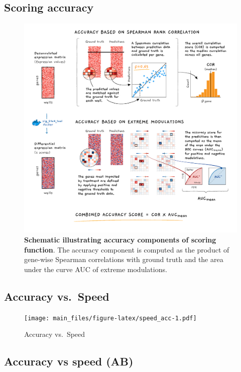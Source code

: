 \documentclass[]{article}
\begin{document}
\hypertarget{scoring-accuracy}{%
\subsection{Scoring accuracy}\label{scoring-accuracy}}

\begin{figure}
\centering
\includegraphics{figures/deconvolution_contest Fig2_Final_revised.png}
\caption{\textbf{Schematic illustrating accuracy components of scoring
function}. The accuracy component is computed as the product of
gene-wise Spearman correlations with ground truth and the area under the
curve AUC of extreme modulations.}
\end{figure}

\hypertarget{accuracy-vs.-speed}{%
\subsection{Accuracy vs.~Speed}\label{accuracy-vs.-speed}}

\begin{figure}
\centering
\texttt{[image: main\_files/figure-latex/speed\_acc-1.pdf]}
\caption{\label{speed_acc}Accuracy vs.~Speed}
\end{figure}

\hypertarget{accuracy-vs-speed-ab}{%
\subsection{Accuracy vs speed (AB)}\label{accuracy-vs-speed-ab}}
\end{document}
